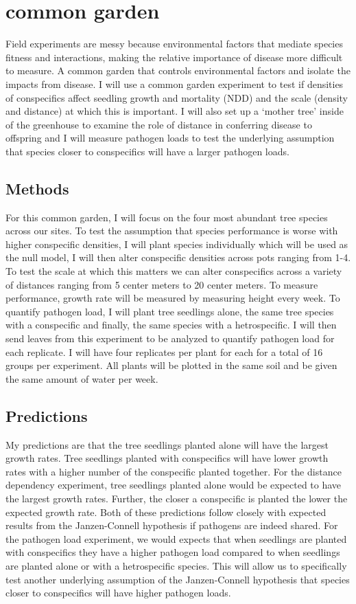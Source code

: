 \documentclass{article}
\begin{document}
\section{common garden}
Field experiments are messy because environmental factors that mediate species fitness and interactions, making the relative importance of disease more difficult to measure. A common garden that controls environmental factors and isolate the impacts from disease. I will use a common garden experiment to test if densities of conspecifics affect seedling growth and mortality (NDD) and the scale (density and distance) at which this is important. I will also set up a ‘mother tree’ inside of the greenhouse to examine the role of distance in conferring disease to offspring and I will measure pathogen loads to test the underlying assumption that species closer to conspecifics will have a larger pathogen loads. 

\subsection{Methods}
For this common garden, I will focus on the four most abundant tree species across our sites. To test the assumption that species performance is worse with higher conspecific densities, I will plant species individually which will be used as the null model, I will then alter conspecific densities across pots ranging from 1-4. To test the scale at which this matters we can alter conspecifics across a variety of distances ranging from 5 center meters to 20 center meters. To measure performance, growth rate will be measured by measuring height every week. To quantify pathogen load, I will plant tree seedlings alone, the same tree species with a conspecific and finally, the same species with a hetrospecific. I will then send leaves from this experiment to be analyzed to quantify pathogen load for each replicate. I will have four replicates per plant for each for a total of 16 groups per experiment. All plants will be plotted in the same soil and be given the same amount of water per week.

\subsection{Predictions}
My predictions are that the tree seedlings planted alone will have the largest growth rates. Tree seedlings planted with conspecifics will have lower growth rates with a higher number of the conspecific planted together. For the distance dependency experiment, tree seedlings planted alone would be expected to have the largest growth rates. Further, the closer a conspecific is planted the lower the expected growth rate. Both of these predictions follow closely with expected results from the Janzen-Connell hypothesis if pathogens are indeed shared. For the pathogen load experiment, we would expects that when seedlings are planted with conspecifics they have a higher pathogen load compared to when seedlings are planted alone or with a hetrospecific species. This will allow us to specifically test another underlying assumption of the Janzen-Connell hypothesis that species closer to conspecifics will have higher pathogen loads. 
\end{document}
